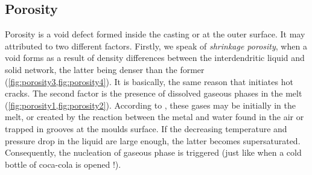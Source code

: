 \subsection*{Porosity}
%
Porosity is a void defect formed inside the casting or at the outer surface. It may attributed to two different factors.
Firstly, we speak of \emph{shrinkage porosity}, when a void forms as a result of density 
differences between the interdendritic liquid and solid network, the latter being denser 
than the former (\cref{fig:porosity3,fig:porosity4}). It is basically, the same reason that initiates hot cracks. 
The second factor is the presence of dissolved gaseous phases in the melt (\cref{fig:porosity1,fig:porosity2}). 
According to \citet{dantzig_solidification_2009}, these gases may be initially in the melt, or created by the 
reaction between the metal and water found in the air or trapped in grooves at the moulds surface. If the 
decreasing temperature and pressure drop in the liquid are large enough, the latter becomes supersaturated. 
Consequently, the nucleation of gaseous phase is triggered (just like when a cold bottle of coca-cola is opened !).
%

